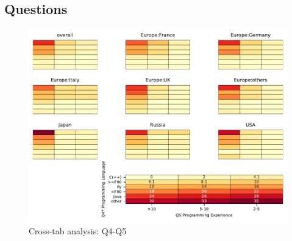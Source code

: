 
\subsection{Questions}


\begin{figure}
\begin{center}
\includegraphics[width=12cm]{../pdfs/Q4-Q5.pdf}
\caption{Cross-tab analysis: Q4-Q5}
\label{fig:Q4-Q5}
\end{center}
\end{figure}
